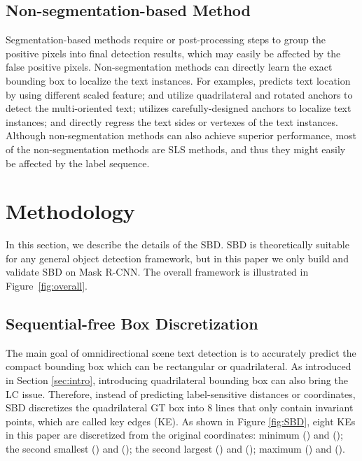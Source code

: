 \documentclass{article}
\begin{document}
\subsection{Non-segmentation-based Method} 
Segmentation-based methods require or post-processing steps to group the positive pixels into final detection results, which may easily be affected by the false positive pixels. Non-segmentation methods can directly learn the exact bounding box to localize the text instances. For examples, \cite{liao2018rotation} predicts text location by using different scaled feature; \cite{liu2017deep} and \cite{ma2018arbitrary} utilize quadrilateral and rotated anchors to detect the multi-oriented text; \cite{liao2018textboxes++} utilizes carefully-designed anchors to localize text instances; \cite{zhou2017east} and \cite{he2017deep} directly regress the text sides or vertexes of the text instances. Although non-segmentation methods can also achieve superior performance, most of the non-segmentation methods are SLS methods, and thus they might easily be affected by the label sequence.

\section{Methodology}
In this section, we describe the details of the SBD. SBD is theoretically suitable for any general object detection framework, but in this paper we only build and validate SBD on Mask R-CNN. The overall framework is illustrated in Figure~\ref{fig:overall}. 



\subsection{Sequential-free Box Discretization}
The main goal of omnidirectional scene text detection is to accurately predict the compact bounding box which can be rectangular or quadrilateral. As introduced in Section \ref{sec:intro}, introducing quadrilateral bounding box can also bring the LC issue. Therefore, instead of predicting label-sensitive distances or coordinates, SBD discretizes the quadrilateral GT box into 8 lines that only contain invariant points, which are called key edges (KE). As shown in Figure \ref{fig:SBD}, eight KEs in this paper are discretized from the original coordinates: minimum  () and  (); the second smallest  () and  (); the second largest  () and  (); maximum  () and  (). 
\end{document}
